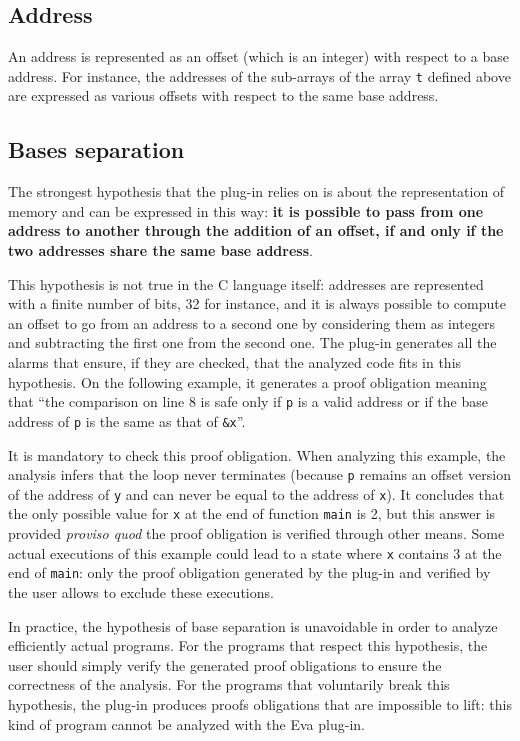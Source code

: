 \documentclass[web]{frama-c-book}
\newcommand{\Eva}{\textsf{Eva}}
\begin{document}
\subsection{Address}

An address is represented as an offset (which is an integer) with
respect to a base address. For instance, the addresses of the sub-arrays
of the array \lstinline|t| defined above are expressed as various offsets with
respect to the same base address.

\subsection{Bases separation}

The strongest hypothesis that the plug-in relies on is about the representation
of memory and can be expressed in this way:
{\bf it is possible to pass from one address to another through the addition
of an offset, if and only if the two addresses share the same base address}.
\medskip

This hypothesis is not true in the C language itself: addresses
are represented with a finite number of bits, 32 for instance,
and it is always possible to compute an offset to go from an address
to a second one by considering them as integers and subtracting the
first one from the second one.
The plug-in generates all the alarms that ensure, if they are checked,
that the analyzed code fits in this hypothesis. On the following example,
it generates a proof obligation meaning that ``the comparison
on line 8 is safe only if \lstinline|p| is a valid address or if the base address
of \lstinline|p| is the same as that of \lstinline|&x|''.

It is mandatory to check this proof obligation.  When analyzing this
example, the analysis infers that the loop never terminates (because
\lstinline|p| remains an offset version of the address of \lstinline|y| and can
never be equal to the address of \lstinline|x|).  It concludes that the
only possible value for \lstinline|x| at the end of function \lstinline|main| is
2, but this answer is provided {\em proviso quod} the proof obligation
is verified through other means. Some actual executions of this
example could lead to a state where \lstinline|x| contains 3 at the end of
\lstinline|main|: only the proof obligation generated by the plug-in and
verified by the user allows to exclude these executions.
\medskip

In practice, the hypothesis of base separation is unavoidable
in order to analyze efficiently actual programs. For the programs that
respect this hypothesis, the user should simply verify the generated
proof obligations to ensure the correctness of the analysis.
For the programs that voluntarily break this hypothesis,
the plug-in produces proofs obligations that are impossible to lift:
this kind of program cannot be analyzed with the \Eva{} plug-in.
\end{document}
